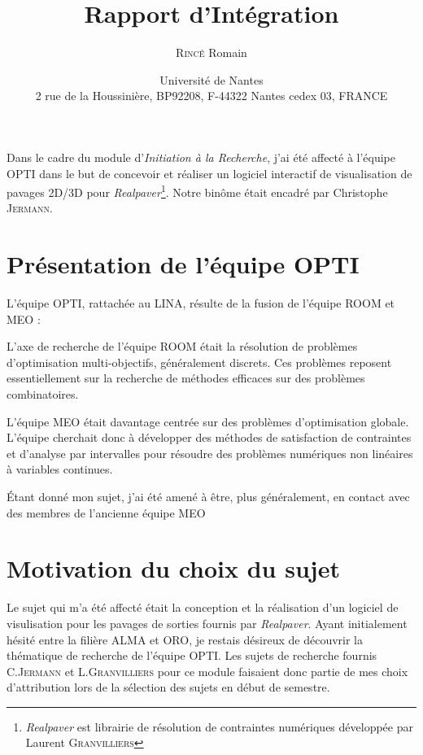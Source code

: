 \documentclass[12pt,a4paper,utf8x,titlepage]{article}
\title{Rapport d'Intégration}
\author{\textsc{Rincé} Romain}
\date{Université de Nantes \\ 2 rue de la Houssinière, BP92208, F-44322 Nantes cedex 03, FRANCE}
\begin{document}
\maketitle
\renewcommand{\labelitemi}{$\bullet$} 
\newcommand{\realpaver}{\emph{Realpaver}}

\clearpage

Dans le cadre du module d'\emph{Initiation à la Recherche}, j'ai été affecté à l'équipe \ac{OPTI} dans le but de concevoir et réaliser un logiciel interactif de visualisation de pavages 2D/3D pour \realpaver\footnote{\realpaver{} est librairie de résolution de contraintes numériques développée par Laurent \textsc{Granvilliers}\cite{Realpaver}}. Notre binôme était encadré par Christophe \textsc{Jermann}.

\section{Présentation de l'équipe \ac{OPTI}}
L'équipe \ac{OPTI}\cite{OPTI}, rattachée au \ac{LINA}\cite{LINA}, résulte de la fusion de l'équipe \ac{ROOM} et \ac{MEO} :
\begin{description}
\item 
L'axe de recherche de l'équipe \ac{ROOM} était la résolution de problèmes d'optimisation multi-objectifs, généralement discrets. Ces problèmes reposent essentiellement sur la recherche de méthodes efficaces sur des problèmes combinatoires.
\item
 L'équipe \ac{MEO} était davantage centrée sur des problèmes d'optimisation globale. L'équipe cherchait donc à développer des méthodes de satisfaction de contraintes et d’analyse par intervalles pour résoudre des problèmes numériques non linéaires à variables continues.
 
 Étant donné mon sujet, j'ai été amené à être, plus généralement, en contact avec des membres de l'ancienne équipe \ac{MEO}
\end{description}
\section{Motivation du choix du sujet}
Le sujet qui m'a été affecté était la conception et la réalisation d'un logiciel de visulisation pour les pavages de sorties fournis par \realpaver. Ayant initialement hésité entre la filière ALMA et ORO, je restais désireux de découvrir la thématique de recherche de l'équipe \ac{OPTI}. Les sujets de recherche fournis C.\textsc{Jermann} et L.\textsc{Granvilliers} pour ce module faisaient donc partie de mes choix d'attribution lors de la sélection des sujets en début de semestre.
\end{document}
